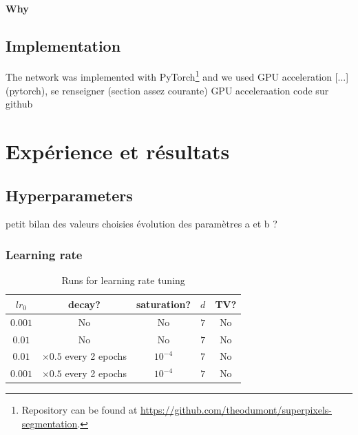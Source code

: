\documentclass{article}
\begin{document}
            \paragraph{Why}

    \subsection{Implementation}
    The network was implemented with PyTorch\footnote{Repository can be found at \url{https://github.com/theodumont/superpixels-segmentation}.} and we used GPU acceleration [...]
    (pytorch), se renseigner (section assez courante)
    GPU acceleraation
    code sur github









\section{Expérience et résultats}
    \subsection{Hyperparameters}
    petit bilan des valeurs choisies
    évolution des paramètres a et b ?\\
        \subsubsection{Learning rate}
        \begin{table}
            \center
            \begin{tabular}{|c|c|c|c|c|}
                \hline
                $lr_0$ & decay? & saturation? & $d$ & TV? \\
                \hline \hline
                $0.001$ & No & No & $7$ & No \\
                \hline
                $0.01$ & No & No & $7$ & No \\
                \hline
                $0.01$ & $\times 0.5$ every 2 epochs & $10^{-4}$ & $7$ & No \\
                \hline
                $0.001$ & $\times 0.5$ every 2 epochs & $10^{-4}$ & $7$ & No \\
                \hline
            \end{tabular}
        \caption{Runs for learning rate tuning}
        \end{table}
\end{document}
